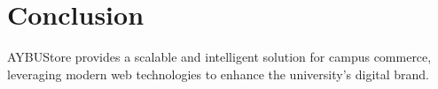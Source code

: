 \documentclass[11pt,a4paper]{article}
\begin{document}
\section{Conclusion}
AYBUStore provides a scalable and intelligent solution for campus commerce, leveraging modern web technologies to enhance the university's digital brand.
\end{document}
